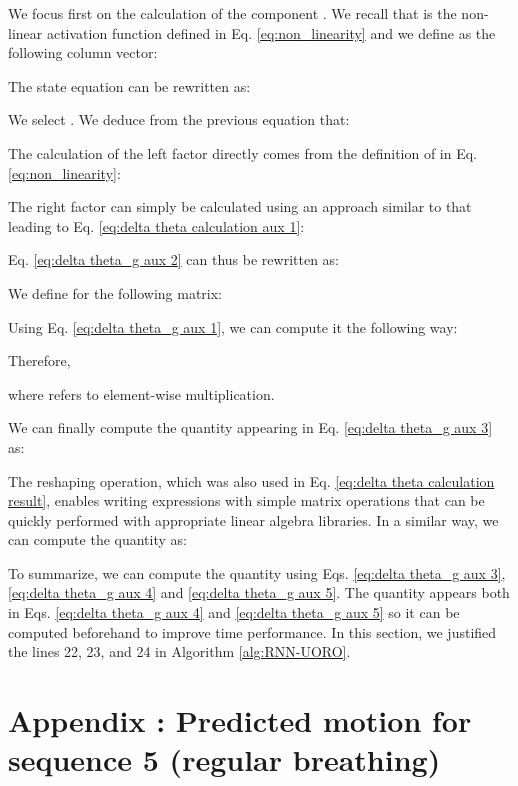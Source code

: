 \documentclass[twocolumn,a4paper]{svjour3} \sloppy          \smartqed
\begin{document}
 

We focus first on the calculation of the component . We recall that  is the non-linear activation function defined in Eq. \ref{eq:non_linearity} and we define  as the following column vector:
 

The state equation can be rewritten as:


We select . We deduce from the previous equation that:
 

The calculation of the left factor directly comes from the definition of  in Eq. \ref{eq:non_linearity}:


The right factor can simply be calculated using an approach similar to that leading to Eq. \ref{eq:delta theta calculation aux 1}:


Eq. \ref{eq:delta theta_g aux 2} can thus be rewritten as:

 

We define for  the following matrix:


Using Eq. \ref{eq:delta theta_g aux 1}, we can compute it the following way:


Therefore,

where  refers to element-wise multiplication.

We can finally compute the quantity  appearing in Eq. \ref{eq:delta theta_g aux 3} as:



The reshaping operation, which was also used in Eq. \ref{eq:delta theta calculation result}, enables writing expressions with simple matrix operations that can be quickly performed with appropriate linear algebra libraries. In a similar way, we can compute the quantity  as:




To summarize, we can compute the quantity  using Eqs. \ref{eq:delta theta_g aux 3}, \ref{eq:delta theta_g aux 4} and \ref{eq:delta theta_g aux 5}. The quantity  appears both in Eqs. \ref{eq:delta theta_g aux 4} and \ref{eq:delta theta_g aux 5} so it can be computed beforehand to improve time performance. In this section, we justified the lines 22, 23, and 24 in Algorithm \ref{alg:RNN-UORO}.


\onecolumn



\section{Appendix : Predicted motion for sequence 5 (regular breathing)}\label{appendix:coordz_marker3_seq5}
\end{document}
